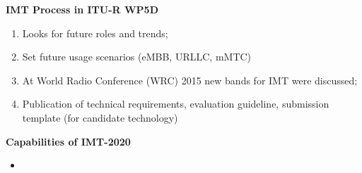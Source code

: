 \documentclass{beamer}
\begin{document}
\begin{frame}[allowframebreaks]
		\newpage
		\textbf{IMT Process in ITU-R WP5D}
		\begin{enumerate}
			\item Looks for future roles and trends;
			\item Set future usage scenarios (eMBB, URLLC, mMTC)
			\item At World Radio Conference (WRC) 2015 new bands for IMT were discussed;
			\item Publication of technical requirements, evaluation guideline, submission template (for candidate technology)
		\end{enumerate}
	
		\newpage
		\textbf{Capabilities of IMT-2020}
		\begin{itemize}
			\item 
		\end{itemize}
		
	\end{frame}
\end{document}
